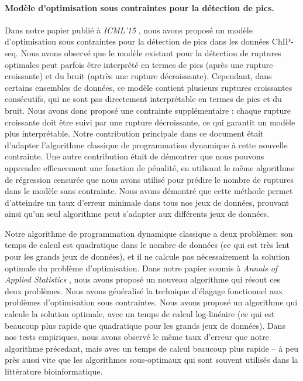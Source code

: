 \documentclass{article}
\begin{document}
\paragraph{Modèle d'optimisation sous contraintes pour la détection de
  pics.} Dans notre papier publié à \emph{ICML'15}
\citep{HOCKING-PeakSeg}, nous avons proposé un modèle d'optimisation
sous contraintes pour la détection de pics dans les données
ChIP-seq. Nous avons observé que le modèle existant pour la détection
de ruptures optimales peut parfois être interprété en termes de pics
(après une rupture croissante) et du bruit (aptrès une rupture
décroissante). Cependant, dans certains ensembles de données, ce
modèle contient plusieurs ruptures croissantes consécutifs, qui ne
sont pas directement interprétable en termes de pics et du bruit. Nous
avons donc proposé une contrainte supplémentaire : chaque rupture
croissante doit être suivi par une rupture décroissante, ce qui
garantit un modèle plus interprétable. Notre contribution principale
dans ce document était d'adapter l'algorithme classique de
programmation dynamique à cette nouvelle contrainte. Une autre
contribution était de démontrer que nous pouvons apprendre
efficacement une fonction de pénalité, en utilisant le même algorithme
de régression censurée que nous avons utilisé pour prédire le nombre
de ruptures dans le modèle sans contrainte. Nous avons démontré que
cette méthode permet d'atteindre un taux d'erreur minimale dans tous
nos jeux de données, prouvant ainsi qu'un seul algorithme peut
s'adapter aux différents jeux de données.

Notre algorithme de programmation dynamique classique a deux
problèmes: son temps de calcul est quadratique dans le nombre de
données (ce qui est très lent pour les grands jeux de données), et il
ne calcule pas nécessairement la solution optimale du problème
d'optimisation. Dans notre papier soumis à \emph{Annals of Applied
  Statistics} \citep{Hocking-constrained-changepoint-detection}, nous
avons proposé un nouveau algorithme qui résout ces deux
problèmes. Nous avons généralisé la technique d'élagage fonctionnel
aux problèmes d'optimisation sous contraintes.  Nous avons proposé un
algorithme qui calcule la solution optimale, avec un temps de calcul
log-linéaire (ce qui est beaucoup plus rapide que quadratique pour les
grands jeux de données). Dans nos tests empiriques, nous avons observé
le même taux d'erreur que notre algorithme précedant, mais avec un
temps de calcul beaucoup plus rapide -- à peu près aussi vite que les
algorithmes sous-optimaux qui sont souvent utilisés dans la littérature
bioinformatique.
  
\end{document}
